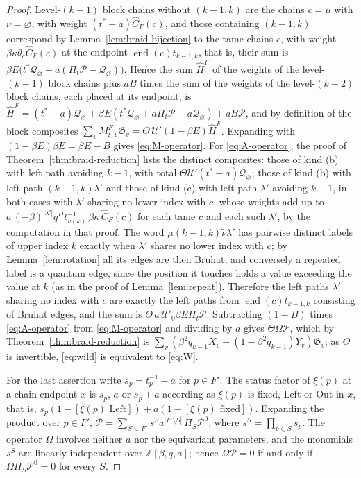 \documentclass[11pt]{article}
\newcommand{\G}{\mathfrak{G}}
\begin{document}
\begin{proof}
Level-$(k-1)$ block chains without $(k-1,k)$ are the chains
$c=\mu$ with $\nu=\varnothing$, with weight $(t^\ast-a)\widehat C_F(c)$,
and those containing $(k-1,k)$ correspond by
Lemma~\ref{lem:braid-bijection} to the tame chains $c$, with weight
$\beta\kappa\theta_c\widehat C_F(c)$ at the endpoint
$\operatorname{end}(c)t_{k-1,k}$, that is, their sum is
$\beta E\bigl(t^\ast\mathcal Q_\varnothing+a(\Pi_t\mathcal P-\mathcal Q_\varnothing)\bigr)$.
Hence the sum $\widehat H^F$ of the weights of the level-$(k-1)$
block chains plus $aB$ times the sum of the weights of the
level-$(k-2)$ block chains, each placed at its endpoint, is
$\widehat H^F=(t^\ast-a)\mathcal Q_\varnothing+\beta E(t^\ast\mathcal Q_\varnothing+a\Pi_t\mathcal P-a\mathcal Q_\varnothing)+aB\mathcal P$,
and by definition of the block composites
$\sum_vM^F_{\xi,v}\G_v=\Theta\,\mathcal U'(1-\beta E)\widehat H^F$.
Expanding with $(1-\beta E)\beta E=\beta E-B$ gives
\eqref{eq:M-operator}. For \eqref{eq:A-operator}, the proof of
Theorem~\ref{thm:braid-reduction} lists the distinct composites: those
of kind (b) with left path avoiding $k-1$, with total
$\Theta\mathcal U'(t^\ast-a)\mathcal Q_\varnothing$; those of kind (b)
with left path $(k-1,k)\lambda'$ and those of kind (c) with left path
$\lambda'$ avoiding $k-1$, in both cases with $\lambda'$ sharing no
lower index with $c$, whose weights add up to
$a\,(-\beta)^{|\lambda'|}q^{D}t^{-1}_{v(k)}\,\beta\kappa\,\widehat C_F(c)$
for each tame $c$ and each such $\lambda'$, by the computation in that
proof. The word $\mu(k-1,k)\tilde\nu\lambda'$ has pairwise distinct
labels of upper index $k$ exactly when $\lambda'$ shares no lower index
with $c$; by Lemma~\ref{lem:rotation} all its edges are then Bruhat,
and conversely a repeated label is a quantum edge, since the position
it touches holds a value exceeding the value at $k$ (as in the proof of
Lemma~\ref{lem:repeat}). Therefore the left paths $\lambda'$ sharing no
index with $c$ are exactly the left paths from
$\operatorname{end}(c)t_{k-1,k}$ consisting of Bruhat edges, and the
sum is $\Theta\,a\,\mathcal U'_0\beta E\Pi_t\mathcal P$. Subtracting
$(1-B)$ times \eqref{eq:A-operator} from \eqref{eq:M-operator} and
dividing by $a$ gives $\Theta\Omega\mathcal P$, which by
Theorem~\ref{thm:braid-reduction} is $\sum_v(\beta^2q_{k-1}X_v-(1-\beta^2q_{k-1})Y_v)\G_v$;
as $\Theta$ is invertible, \eqref{eq:wild} is equivalent to \eqref{eq:W}.

For the last assertion write $s_p=t^{-1}_p-a$ for $p\in F'$. The
status factor of $\xi(p)$ at a chain endpoint $x$ is $s_p$, $a$ or
$s_p+a$ according as $\xi(p)$ is fixed, Left or Out in $x$, that is,
$s_p(1-[\xi(p)\text{ Left}])+a(1-[\xi(p)\text{ fixed}])$. Expanding
the product over $p\in F'$,
$\mathcal P=\sum_{S\subseteq F'}s^S a^{|F'\setminus S|}\,\Pi_S\mathcal P^0$,
where $s^S=\prod_{p\in S}s_p$. The operator $\Omega$ involves neither
$a$ nor the equivariant parameters, and the monomials $s^S$ are
linearly independent over $\mathbb Z[\beta,q,a]$; hence
$\Omega\mathcal P=0$ if and only if $\Omega\Pi_S\mathcal P^0=0$ for
every $S$.
\end{proof}
\end{document}
